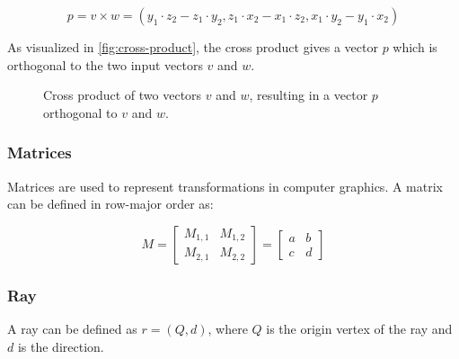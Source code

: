\begin{equation}
  \label{eqn:cross-product}
  p = v \times w = (y_1 \cdot z_2 - z_1 \cdot y_2, z_1 \cdot x_2 - x_1 \cdot z_2, x_1 \cdot y_2 - y_1 \cdot x_2)
\end{equation}

As visualized in \autoref{fig:cross-product}, the cross product gives a vector $p$ which is orthogonal to the two input vectors $v$ and $w$.

\begin{figure}[H]
  \centering
  \caption{Cross product of two vectors $v$ and $w$, resulting in a vector $p$ orthogonal to $v$ and $w$.}
  \label{fig:cross-product}
\end{figure}

\subsubsection{Matrices}

Matrices are used to represent transformations in computer graphics. A matrix can be defined in row-major order as:

\begin{equation}
  \label{eqn:matrix}
  M = \begin{bmatrix} M_{1,1} & M_{1,2} \\ M_{2,1} & M_{2,2} \end{bmatrix} = \begin{bmatrix} a & b \\ c & d \end{bmatrix}
\end{equation}

\subsubsection{Ray}

A ray can be defined as $r = (Q, d)$, where $Q$ is the origin vertex of the ray and $d$ is the direction.

